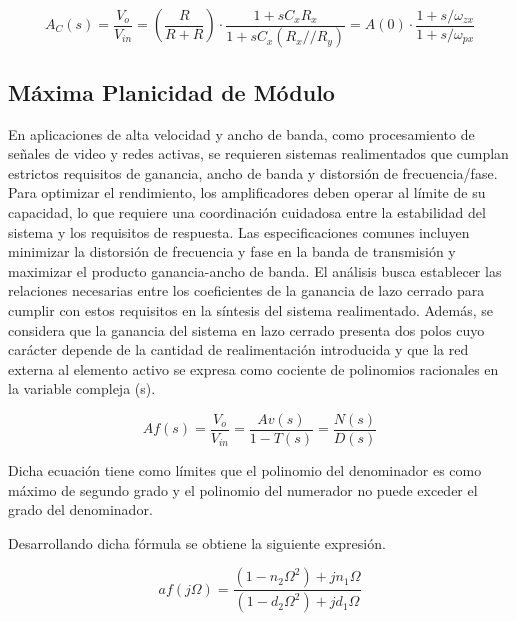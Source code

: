 \begin{equation}
    A_C (s) = \frac{V_o}{V_{in}} = \left( \frac{R}{R + R} \right) \cdot \frac{1 + sC_x R_x}{1 + sC_x (R_x // R_y)} = A(0) \cdot \frac{1 + s/\omega _{zx}}{1 + s/ \omega _{px}}
\end{equation}

\newpage
\subsection{Máxima Planicidad de Módulo}

\hspace{1mm}En aplicaciones de alta velocidad y ancho de banda, como procesamiento de señales de video y redes activas, se requieren sistemas realimentados que cumplan estrictos requisitos de ganancia, ancho de banda y distorsión de frecuencia/fase. Para optimizar el rendimiento, los amplificadores deben operar al límite de su capacidad, lo que requiere una coordinación cuidadosa entre la estabilidad del sistema y los requisitos de respuesta. Las especificaciones comunes incluyen minimizar la distorsión de frecuencia y fase en la banda de transmisión y maximizar el producto ganancia-ancho de banda. El análisis busca establecer las relaciones necesarias entre los coeficientes de la ganancia de lazo cerrado para cumplir con estos requisitos en la síntesis del sistema realimentado. Además, se considera que la ganancia del sistema en lazo cerrado presenta dos polos cuyo carácter depende de la cantidad de realimentación introducida y que la red externa al elemento activo se expresa como cociente de polinomios racionales en la variable compleja (s).

\begin{equation}
    Af(s) =  \frac{V_o}{V_{in}} = \frac{Av (s)}{1 - T(s)} = \frac{N(s)}{D(s)}
\end{equation}

\bigskip
\hspace{1mm} Dicha ecuación tiene como límites que el polinomio del denominador es como máximo de segundo grado y el polinomio del numerador no puede exceder el grado del denominador.

\hspace{1mm} Desarrollando dicha fórmula se obtiene la siguiente expresión.

\begin{equation}
    af(j \Omega) = \frac{(1 - n_2 \Omega ^2) + jn_1 \Omega}{(1 - d_2 \Omega ^2) + jd_1 \Omega}
\end{equation}

